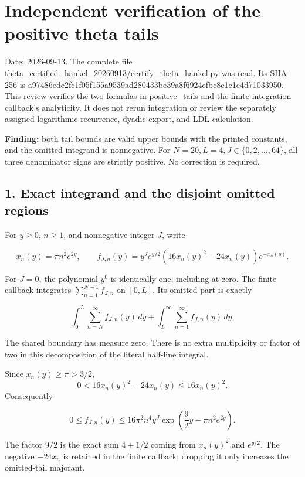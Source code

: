 \section{Independent verification of the positive theta tails}\label{C47stage:TT:independent-verification-of-the-positive-theta-tails}

Date: 2026-09-13. The complete file theta\_certified\_hankel\_20260913/certify\_theta\_hankel.py was read. Its SHA-256 is a97486edc2fc1f05f155a9539ad280433be39a8f6924efbc8c1c1c4d71033950. This review verifies the two formulas in positive\_tails and the finite integration callback's analyticity. It does not rerun integration or review the separately assigned logarithmic recurrence, dyadic export, and LDL calculation.

\textbf{Finding:} both tail bounds are valid upper bounds with the printed constants, and the omitted integrand is nonnegative. For \(N=20,L=4,J\in\{0,2,\ldots,64\}\), all three denominator signs are strictly positive. No correction is required.

\subsection{1. Exact integrand and the disjoint omitted regions}\label{C47stage:TT:exact-integrand-and-the-disjoint-omitted-regions}

For \(y\ge0\), \(n\ge1\), and nonnegative integer \(J\), write

\[
x_n(y)=\pi n^2e^{2y},\qquad
f_{J,n}(y)=y^Je^{y/2}(16x_n(y)^2-24x_n(y))e^{-x_n(y)}.
\tag{TT1}
\]

For \(J=0\), the polynomial \(y^0\) is identically one, including at zero. The finite callback integrates \(\sum_{n=1}^{N-1}f_{J,n}\) on \([0,L]\). Its omitted part is exactly

\[
\int_0^L\sum_{n=N}^{\infty}f_{J,n}(y)\,dy
+\int_L^\infty\sum_{n=1}^{\infty}f_{J,n}(y)\,dy.
\tag{TT2}
\]

The shared boundary has measure zero. There is no extra multiplicity or factor of two in this decomposition of the literal half-line integral.

Since \(x_n(y)\ge\pi>3/2\), \[
0<16x_n(y)^2-24x_n(y)\le16x_n(y)^2.
\] Consequently

\[
0\le f_{J,n}(y)
\le16\pi^2 n^4 y^J
\exp\!\left(\frac92y-\pi n^2e^{2y}\right).
\tag{TT3}
\]

The factor \(9/2\) is the exact sum \(4+1/2\) coming from \(x_n(y)^2\) and \(e^{y/2}\). The negative \(-24x_n\) is retained in the finite callback; dropping it only increases the omitted-tail majorant.

